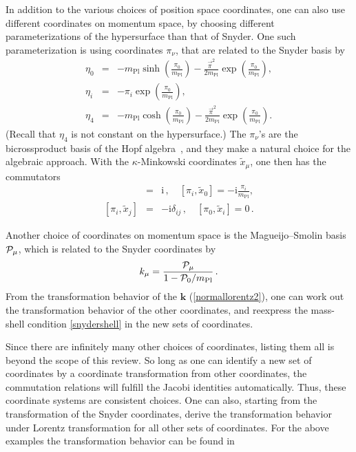 \documentclass{article}
\def\beqn{\begin{eqnarray}}
\def\eeqn{\end{eqnarray}}
\begin{document}
In addition to the various choices of position space coordinates, one can also use different coordinates
on momentum space, by choosing different parameterizations of the hypersurface than that of Snyder.
One such parameterization is using coordinates $\pi_\nu$, that are related to the Snyder basis by
\beqn
\eta_0 &=& - m_{\mathrm{Pl}} \sinh \left( \frac{\pi_0}{m_{\mathrm{Pl}}}\right) - \frac{\vec \pi^2}{2 m_{\mathrm{Pl}}} \exp \left( \frac{\pi_0}{m_{\mathrm{Pl}}}\right), \nonumber\\
\eta_i &=& - \pi_i \exp \left( \frac{\pi_0}{m_{\mathrm{Pl}}}\right), \nonumber \\
\eta_4 &=& - m_{\mathrm{Pl}}  \cosh \left( \frac{\pi_0}{m_{\mathrm{Pl}}}\right) - \frac{\vec \pi^2}{2 m_{\mathrm{Pl}}} \exp \left( \frac{\pi_0}{m_{\mathrm{Pl}}}\right) .
\label{bicross}
\eeqn
(Recall that $\eta_4$ is not constant on the hypersurface.) The $\pi_\nu$'s are the bicrossproduct basis of the
Hopf algebra~\cite{Majid:1994cy}, and they make a natural choice for the algebraic approach. With the $\kappa$-Minkowski coordinates $\tilde x_\mu$, one then has the commutators~\cite{KowalskiGlikman:2003we} 
\beqn
[\pi_0 , \tilde x_0] &=& \mathrm{i} \,, \quad [\pi_i,\tilde x_0 ] = - \mathrm{i} \frac{\pi_i}{m_{\mathrm{Pl}}} , \nonumber \\
\left[\pi_i, \tilde x_j \right] &=& - \mathrm{i} \delta_{ij} \,, \quad [ \pi_0, \tilde x_i] = 0 \,.
\eeqn

Another choice of coordinates on momentum space is the
Magueijo--Smolin basis ${\cal P}_\mu$, which is related to the Snyder coordinates by
\beqn
k_\mu = \frac{{\cal P}_\mu}{1- {\cal P}_0/m_{\mathrm{Pl}}} \,. \label{magsmo}
\eeqn
From the transformation behavior of the $\mathbf{k}$ (\ref{normallorentz2}), one can work out the transformation
behavior of the other coordinates, 
and reexpress the mass-shell condition \ref{snydershell} in the new sets of coordinates. 

Since there are infinitely many other choices of coordinates, listing them all is beyond the scope of 
this review.  So long as one can identify a new
set of coordinates by a coordinate transformation from other coordinates, the commutation relations
will fulfill the Jacobi identities automatically. Thus, these coordinate systems are consistent
choices. One can also, starting from the transformation of
the Snyder coordinates, derive the transformation behavior under Lorentz transformation for all 
other sets of coordinates. For the above examples the transformation behavior can be found
in~\cite{Girelli:2005dc,KowalskiGlikman:2003we} 
\end{document}
